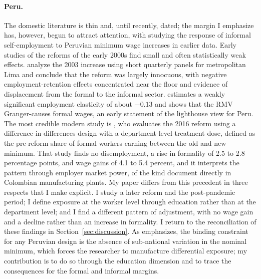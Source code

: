 \paragraph{Peru.} The domestic literature is thin and, until recently, dated; the
margin I emphasize has, however, begun to attract attention, with
\citet{corcuera_2024} studying the response of informal self-employment to Peruvian
minimum wage increases in earlier data. Early
studies of the reforms of the early 2000s find small and often statistically weak
effects. \citet{jaramillo_lopez_2006} analyze the 2003 increase using short quarterly
panels for metropolitan Lima and conclude that the reform was largely innocuous, with
negative employment-retention effects concentrated near the floor and evidence of
displacement from the formal to the informal sector. \citet{cespedes_2005} estimates a
weakly significant employment elasticity of about $-0.13$ and shows that the RMV
Granger-causes formal wages, an early statement of the lighthouse view for Peru. The
most credible modern study is \citet{jimenez_2023}, who evaluates the 2016 reform using
a difference-in-differences design with a department-level treatment dose, defined as
the pre-reform share of formal workers earning between the old and new minimum. That
study finds no disemployment, a rise in formality of 2.5 to 2.8 percentage
points, and wage gains of 4.1 to 5.4 percent, and it interprets the pattern
through employer market power, of the kind \citet{amodio_deroux_2021} document
directly in Colombian manufacturing plants. My paper differs from this precedent in three
respects that I make explicit. I study a later reform and the post-pandemic period;
I define exposure at the worker level through education rather than at the department
level; and I find a different pattern of adjustment, with no wage gain and a decline
rather than an increase in formality. I return to the reconciliation of these
findings in Section~\ref{sec:discussion}. As \citet{jimenez_2023} emphasizes, the
binding constraint for any Peruvian design is the absence of sub-national variation in
the nominal minimum, which forces the researcher to manufacture differential exposure;
my contribution is to do so through the education dimension and to trace the
consequences for the formal and informal margins.

